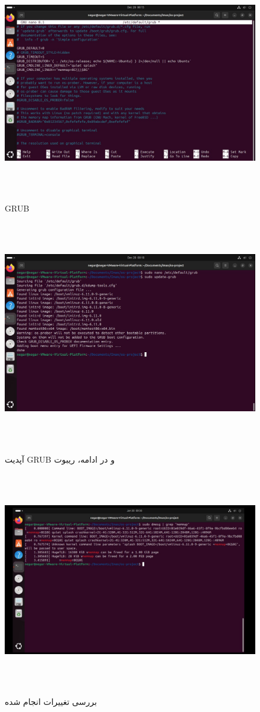‫
‫\begin{figure}[H]
‫	‫    \centering
‫	‫    \includegraphics[width=\textwidth]{figs/11.jpg}
‫	‫    \caption{GRUB}
‫\end{figure}
‫
‫‫\begin{figure}[H]
‫	‫	‫    \centering
‫	‫	‫    \includegraphics[width=\textwidth]{figs/12.jpg}
‫	‫	‫    \caption{آپدیت GRUB و در ادامه، ریبوت}
‫\end{figure}
‫
‫‫‫\begin{figure}[H]
‫	‫	‫	‫    \centering
‫	‫	‫	‫    \includegraphics[width=\textwidth]{figs/13.jpg}
‫			\caption{بررسی تغییرات انجام شده}
‫\end{figure}
